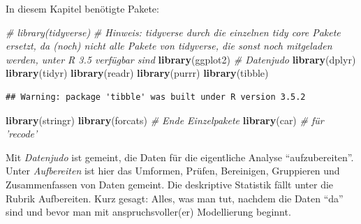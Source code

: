 \documentclass[12pt,ngerman,paper=a4,pagesize,DIV=13]{scrreprt}
\newenvironment{Shaded}{\begin{snugshade}}{\end{snugshade}}
\newcommand{\CommentTok}[1]{\textcolor[rgb]{0.56,0.35,0.01}{\textit{#1}}}
\newcommand{\KeywordTok}[1]{\textcolor[rgb]{0.13,0.29,0.53}{\textbf{#1}}}
\newcommand{\NormalTok}[1]{#1}
\begin{document}
In diesem Kapitel benötigte Pakete:

\begin{Shaded}
\begin{Highlighting}[]
\CommentTok{# library(tidyverse)}
\CommentTok{# Hinweis: tidyverse durch die einzelnen tidy core Pakete ersetzt, da (noch) nicht alle Pakete von tidyverse, die sonst noch mitgeladen werden, unter R 3.5 verfügbar sind}
\KeywordTok{library}\NormalTok{(ggplot2) }\CommentTok{# Datenjudo}
\KeywordTok{library}\NormalTok{(dplyr)}
\KeywordTok{library}\NormalTok{(tidyr)}
\KeywordTok{library}\NormalTok{(readr)}
\KeywordTok{library}\NormalTok{(purrr)}
\KeywordTok{library}\NormalTok{(tibble)}
\end{Highlighting}
\end{Shaded}

\begin{verbatim}
## Warning: package 'tibble' was built under R version 3.5.2
\end{verbatim}

\begin{Shaded}
\begin{Highlighting}[]
\KeywordTok{library}\NormalTok{(stringr)}
\KeywordTok{library}\NormalTok{(forcats) }\CommentTok{# Ende Einzelpakete}
\KeywordTok{library}\NormalTok{(car)  }\CommentTok{# für 'recode'}
\end{Highlighting}
\end{Shaded}

Mit \emph{Datenjudo} ist gemeint, die Daten für die eigentliche Analyse
\enquote{aufzubereiten}. Unter \emph{Aufbereiten} ist hier das Umformen,
Prüfen, Bereinigen, Gruppieren und Zusammenfassen von Daten gemeint. Die
deskriptive Statistik fällt unter die Rubrik Aufbereiten. Kurz gesagt:
Alles, was man tut, nachdem die Daten \enquote{da} sind und bevor man
mit anspruchsvoller(er) Modellierung beginnt.
\end{document}
